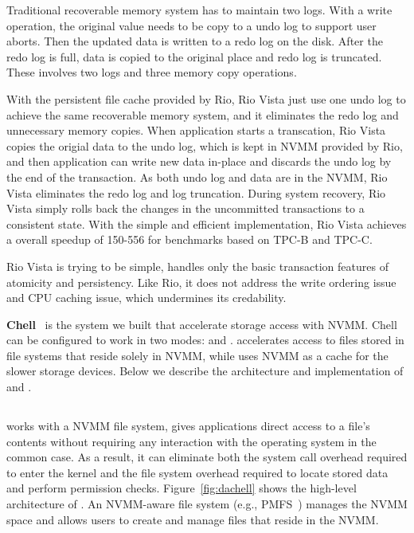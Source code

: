 Traditional recoverable memory system has to maintain two logs. With a write
operation, the original value needs to be copy to a undo log to support user
aborts. Then the updated data is written to a redo log on the disk. After
the redo log is full, data is copied to the original place and redo log is
truncated. These involves two logs and three memory copy operations.

With the persistent file cache provided by Rio,
Rio Vista just use one undo log to achieve the same recoverable memory system,
and it eliminates the redo log
and unnecessary memory copies. When
application starts a transcation, Rio Vista copies the origial data to the 
undo log, which is kept in NVMM provided by Rio, and then application can
write new data in-place and discards the undo log by the end of the transaction.
As both undo log and data are in the NVMM, Rio Vista eliminates the redo log and
log truncation. During system recovery, Rio Vista simply rolls back the changes
in the uncommitted transactions to a consistent state.
With the simple and efficient implementation, Rio Vista
achieves a overall speedup of 150-556\x{} for benchmarks based on TPC-B and
TPC-C.

Rio Vista is trying to be simple, handles only the basic transaction features
of atomicity and persistency. Like Rio, it does not address the write ordering
issue and CPU caching issue, which undermines its credability. 

\textbf{Chell}~\cite{Chell} is the system we built that accelerate storage
access with NVMM. Chell can be configured to work in two modes: \DAChell{}
and \CChell{}. \DAChell{} accelerates access to files stored in file systems
that reside solely in NVMM, while \CChell{} uses NVMM as a cache for the
slower storage devices. Below we describe the architecture and implementation
of \DAChell{} and \CChell{}.

\subsection{\DAChell{}}



\DAChell{} works with a NVMM file system, gives applications direct access to
a file's contents without
requiring any interaction with the operating system in the common case.  As a
result, it can eliminate both the system call overhead required to enter the
kernel and the file system overhead required to locate stored data and perform
permission checks.
Figure~\ref{fig:dachell} shows the high-level architecture of
\DAChell{}. An NVMM-aware file system (e.g.,
PMFS~\cite{PMFS}) manages the NVMM space and allows users to create and manage
files that reside in the NVMM.

